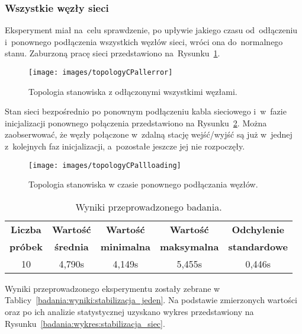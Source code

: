 \subsubsection{Wszystkie węzły sieci}
\label{badania:cala_siec}
Eksperyment miał na~celu sprawdzenie, po upływie jakiego czasu od~odłączeniu i~ponownego podłączenia wszystkich węzłów sieci, wróci ona do~normalnego stanu. Zaburzoną pracę sieci przedstawiono na~Rysunku~\ref{topologyCPallerror}.
\begin{figure}[!htb] 	\centering 	\texttt{[image: images/topologyCPallerror]} \caption{Topologia stanowiska z odłączonymi wszystkimi węzłami.} \label{topologyCPallerror} \end{figure}

Stan sieci bezpośrednio po ponownym podłączeniu kabla sieciowego i~w~fazie inicjalizacji ponownego połączenia przedstawiono na Rysunku~\ref{topologyCPallloading}. Można zaobserwować, że węzły połączone w~zdalną stację wejść/wyjść są już w~jednej z~kolejnych faz inicjalizacji, a~pozostałe jeszcze jej nie rozpoczęły.
\begin{figure}[!htb] 	\centering 	\texttt{[image: images/topologyCPallloading]} \caption{Topologia stanowiska w czasie ponownego podłączania węzłów.} \label{topologyCPallloading} \end{figure}

\begin{table}[!htb]
\begin{center}
\begin{tabular}{| c | c | c | c | c |}\hline
\textbf{Liczba} & \textbf{Wartość} & \textbf{Wartość} & \textbf{Wartość} & \textbf{Odchylenie} \\
\textbf{próbek} & \textbf{średnia} & \textbf{minimalna} & \textbf{maksymalna} & \textbf{standardowe} \\\hline\hline
10 & 4,790s & 4,149s & 5,455s & 0,446s\\\hline
\end{tabular}
\end{center}
\vspace*{-6mm}
  \caption{Wyniki przeprowadzonego badania.}
	\label{badania:wyniki:stabilizacja_siec}
\end{table}

Wyniki przeprowadzonego eksperymentu zostały zebrane w Tablicy~\ref{badania:wyniki:stabilizacja_jeden}. Na podstawie zmierzonych wartości oraz po ich analizie statystycznej uzyskano wykres przedstawiony na Rysunku~\ref{badania:wykres:stabilizacja_siec}.


